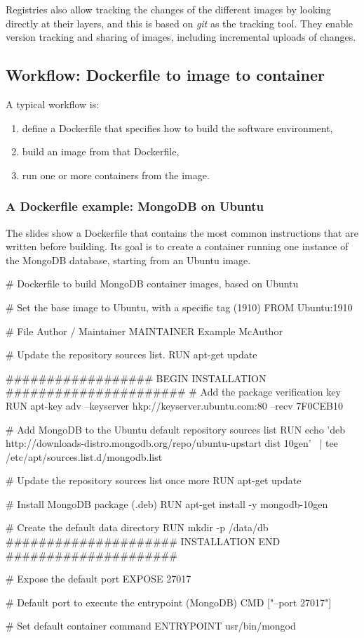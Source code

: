 Registries also allow tracking the changes of the different images by looking directly at their layers, and this is based on \emph{git} as the tracking tool. They enable version tracking and sharing of images, including incremental uploads of changes.

\subsection{Workflow: Dockerfile to image to container}

A typical workflow is:

\begin{enumerate}
\item define a Dockerfile that specifies how to build the software environment,
\item build an image from that Dockerfile,
\item run one or more containers from the image.
\end{enumerate}

\subsubsection*{A Dockerfile example: MongoDB on Ubuntu}

The slides show a Dockerfile that contains the most common instructions that are written before building. Its goal is to create a container running one instance of the MongoDB database, starting from an Ubuntu image.

\begin{codeblock}
# Dockerfile to build MongoDB container images, based on Ubuntu

# Set the base image to Ubuntu, with a specific tag (1910)
FROM Ubuntu:1910

# File Author / Maintainer
MAINTAINER Example McAuthor

# Update the repository sources list.
RUN apt-get update

################## BEGIN INSTALLATION ######################
# Add the package verification key
RUN apt-key adv --keyserver hkp://keyserver.ubuntu.com:80 --recv 7F0CEB10

# Add MongoDB to the Ubuntu default repository sources list
RUN echo 'deb http://downloads-distro.mongodb.org/repo/ubuntu-upstart dist 10gen' \
    | tee /etc/apt/sources.list.d/mongodb.list

# Update the repository sources list once more
RUN apt-get update

# Install MongoDB package (.deb)
RUN apt-get install -y mongodb-10gen

# Create the default data directory
RUN mkdir -p /data/db
##################### INSTALLATION END #####################

# Expose the default port
EXPOSE 27017

# Default port to execute the entrypoint (MongoDB)
CMD ["--port 27017"]

# Set default container command
ENTRYPOINT usr/bin/mongod
\end{codeblock}

